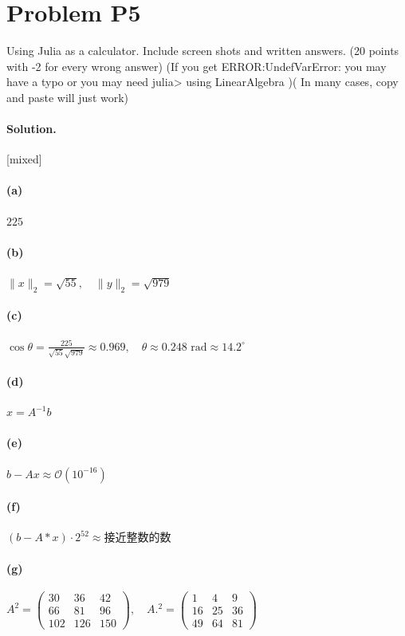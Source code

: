 \documentclass[11pt,a4paper]{article}
\newcommand{\solvertag}[1]{{\footnotesize\color{gray}\textsf{[#1]}}}
\begin{document}
\section*{Problem P5}
Using Julia as a calculator. Include screen shots and written answers. (20 points with -2
for every wrong answer)
(If you get ERROR:UndefVarError: you may have a typo or you may need
julia> using LinearAlgebra )( In many cases, copy and paste will just work)

\paragraph{Solution.} \solvertag{mixed} 

\paragraph{(a)} $225$

\paragraph{(b)} $\|x\|_2=\sqrt{55},\quad \|y\|_2=\sqrt{979}$

\paragraph{(c)} $\cos\theta=\frac{225}{\sqrt{55}\sqrt{979}}\approx 0.969,\quad \theta\approx 0.248\text{ rad}\approx 14.2^\circ$

\paragraph{(d)} $x = A^{-1} b$

\paragraph{(e)} $b-Ax \approx \mathcal{O}(10^{-16})$

\paragraph{(f)} $(b-A*x)\cdot 2^{52}\approx \text{接近整数的数}$

\paragraph{(g)} $A^2=\begin{pmatrix}30&36&42\\66&81&96\\102&126&150\end{pmatrix},\quad A.^2=\begin{pmatrix}1&4&9\\16&25&36\\49&64&81\end{pmatrix}$
\end{document}

